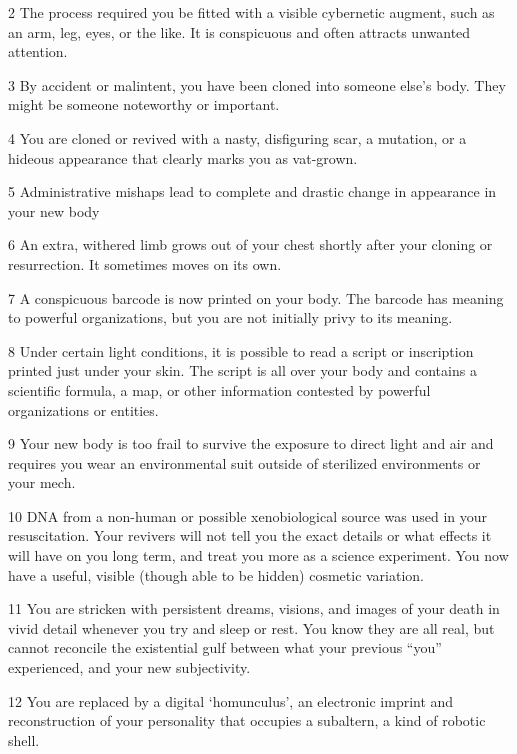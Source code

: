 2          The process required you be fitted with a visible cybernetic augment, such as an arm, leg,
           eyes, or the like. It is conspicuous and often attracts unwanted attention.

3          By accident or malintent, you have been cloned into someone else’s body. They might be
           someone noteworthy or important.

4          You are cloned or revived with a nasty, disfiguring scar, a mutation, or a hideous appearance
           that clearly marks you as vat-grown.

5          Administrative mishaps lead to complete and drastic change in appearance in your new body

6          An extra, withered limb grows out of your chest shortly after your cloning or resurrection. It
           sometimes moves on its own.

7          A conspicuous barcode is now printed on your body. The barcode has meaning to powerful
           organizations, but you are not initially privy to its meaning.

8          Under certain light conditions, it is possible to read a script or inscription printed just under
           your skin. The script is all over your body and contains a scientific formula, a map, or other
           information contested by powerful organizations or entities.

9          Your new body is too frail to survive the exposure to direct light and air and requires you wear
           an environmental suit outside of sterilized environments or your mech.

10         DNA from a non-human or possible xenobiological source was used in your resuscitation. Your
           revivers will not tell you the exact details or what effects it will have on you long term, and treat
           you more as a science experiment. You now have a useful, visible (though able to be hidden)
           cosmetic variation.

11         You are stricken with persistent dreams, visions, and images of your death in vivid detail
           whenever you try and sleep or rest. You know they are all real, but cannot reconcile the
           existential gulf between what your previous “you” experienced, and your new subjectivity.

12         You are replaced by a digital ‘homunculus’, an electronic imprint and reconstruction of your
           personality that occupies a subaltern, a kind of robotic shell.

